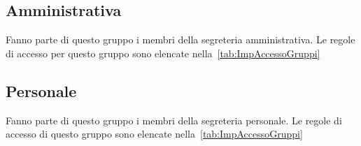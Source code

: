 \subsection{Amministrativa}
Fanno parte di questo gruppo i membri della segreteria amministrativa. Le  regole di accesso per questo gruppo sono elencate nella~\cref{tab:ImpAccessoGruppi}
\subsection{Personale}
Fanno parte di questo gruppo i membri della segreteria personale. Le  regole di accesso di questo gruppo sono elencate nella~\cref{tab:ImpAccessoGruppi}
